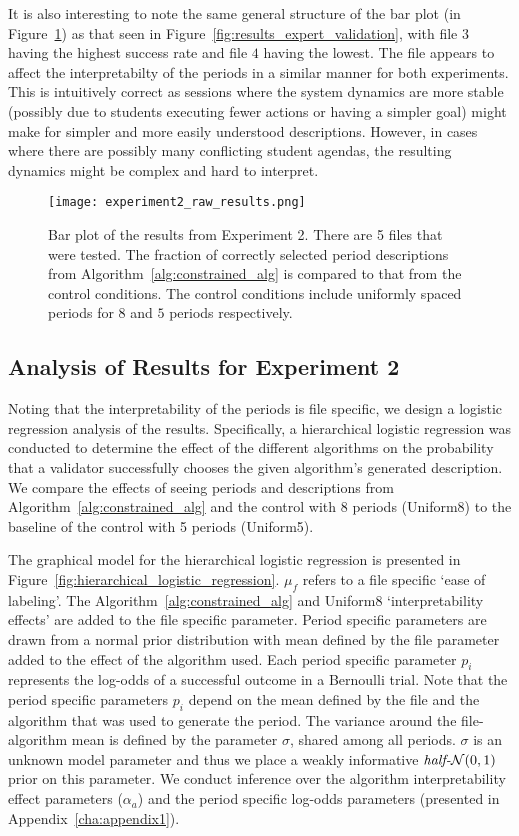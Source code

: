 It is also interesting to note the same general structure of the bar plot (in Figure~\ref{fig:experiment2_raw_results}) as that seen in Figure~\ref{fig:results_expert_validation}, with file $3$ having the highest success rate and file $4$ having the lowest. The file appears to affect the interpretabilty of the periods in a similar manner for both experiments. This is intuitively correct as sessions where the system dynamics are more stable (possibly due to students executing fewer actions or having a simpler goal) might make for simpler and more easily understood descriptions. However, in cases where there are possibly many conflicting student agendas, the resulting dynamics might be complex and hard to interpret.

\begin{figure}
\centering
\texttt{[image: experiment2\_raw\_results.png]}
\caption{Bar plot of the results from Experiment 2. There are 5 files that were tested. The fraction of correctly selected period descriptions from Algorithm~\ref{alg:constrained_alg} is compared to that from the control conditions. The control conditions include uniformly spaced periods for $8$ and $5$ periods respectively.}
\label{fig:experiment2_raw_results}
\end{figure}

\subsection{Analysis of Results for Experiment 2}
Noting that the interpretability of the periods is file specific, we design a logistic regression analysis of the results. Specifically, a hierarchical logistic regression was conducted to determine the effect of the different algorithms on the probability that a validator successfully chooses the given algorithm's generated description. We compare the effects of seeing periods and descriptions from Algorithm~\ref{alg:constrained_alg} and the control with $8$ periods (Uniform8) to the baseline of the control with 5 periods (Uniform5).

The graphical model for the hierarchical logistic regression is presented in Figure~\ref{fig:hierarchical_logistic_regression}. $\mu_f$ refers to a file specific `ease of labeling'. The Algorithm~\ref{alg:constrained_alg} and Uniform8 `interpretability effects' are added to the file specific parameter. Period specific parameters are drawn from a normal prior distribution with mean defined by the file parameter added to the effect of the algorithm used. Each period specific parameter $p_i$ represents the log-odds of a successful outcome in a Bernoulli trial. Note that the period specific parameters $p_i$ depend on the mean defined by the file and the algorithm that was used to generate the period. The variance around the file-algorithm mean is defined by the parameter $\sigma$, shared among all periods. $\sigma$ is an unknown model parameter and thus we place a weakly informative $\text{\textit{half-}}\mathcal{N}(0,1)$ prior on this parameter. We conduct inference over the algorithm interpretability effect parameters ($\alpha_a$) and the period specific log-odds parameters (presented in Appendix~\ref{cha:appendix1}).

